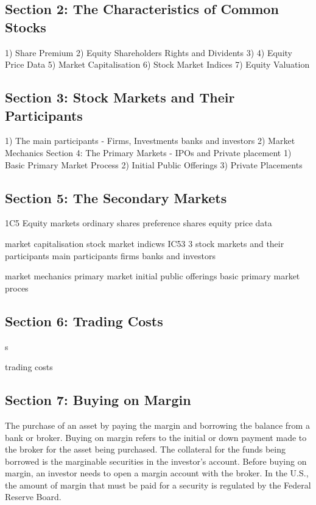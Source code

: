 \subsection*{Section 2: The Characteristics of Common Stocks}
1) Share Premium
2) Equity Shareholders Rights and Dividents
3)
4) Equity Price Data
5) Market Capitalisation
6) Stock Market Indices
7) Equity Valuation
\subsection*{Section 3: Stock Markets and Their Participants}
1) The main participants - Firms, Investments banks and investors
2) Market Mechanics
Section 4: The Primary Markets - IPOs and Private placement
1) Basic Primary Market Process
2) Initial Public Offerings
3) Private Placements
\subsection*{Section 5: The Secondary Markets}

1C5 Equity markets
ordinary shares
preference shares
equity price data

market capitalisation
stock market indicws
IC53
3 stock markets and their participants
main participants
firms banks and investors

market mechanics
primary market 
initial public offerings
basic primary market proces
\subsection*{Section 6: Trading Costs}
s

trading costs


\subsection*{Section 7: Buying on Margin}
The purchase of an asset by paying the margin and borrowing the balance from a bank or broker. Buying on margin refers to the initial or down payment made to the broker for the asset being purchased. The collateral for the funds being borrowed is the marginable securities in the investor's account. Before buying on margin, an investor needs to open a margin account with the broker. In the U.S., the amount of margin that must be paid for a security is regulated by the Federal Reserve Board.




